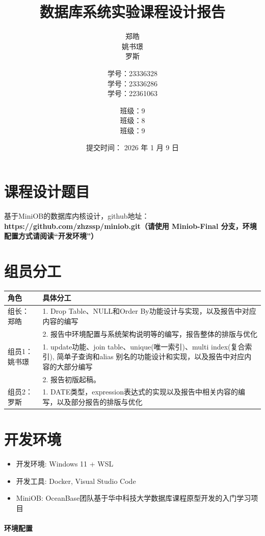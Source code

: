 \documentclass[a4paper, 12pt]{article}
\title{\heiti 数据库系统实验课程设计报告}
\author{
    郑皓 \\ 姚书璟\\ 罗斯
    \and
    学号：23336328  \\ 学号：23336286 \\ 学号：22361063
    \and
    班级：9 \\ 班级：8 \\ 班级：9
}
\date{提交时间： 2026 年 1 月 9 日}
\begin{document}
\maketitle

\section*{\heiti 课程设计题目}
基于MiniOB的数据库内核设计，github地址：\textbf{\heiti https://github.com/zhzssp/miniob.git（请使用 Miniob-Final 分支，环境配置方式请阅读“开发环境”）}

\section*{\heiti 组员分工}
\renewcommand{\arraystretch}{1.5}  %
\begin{tabular}{|p{3cm}|p{12cm}|}
    \hline  %
    \textbf{角色} & \textbf{具体分工} \\
    \hline
    \centering 组长：郑皓 & 
    1. Drop Table、NULL和Order By功能设计与实现，以及报告中对应内容的编写 \\
    & 2. 报告中环境配置与系统架构说明等的编写，报告整体的排版与优化 \\
    \hline
    \centering 组员1：姚书璟 & 
    1. update功能、join table、unique(唯一索引)、multi index(复合索引),  简单子查询和alias 别名的功能设计和实现，以及报告中对应内容的大部分编写\\
    &2. 报告初版起稿。\\
    \hline
    \centering 组员2：罗斯 & 
    1. DATE类型，expression表达式的实现以及报告中相关内容的编写，以及部分报告的排版与优化\\
    \hline
\end{tabular}

\tableofcontents

\section{\heiti 开发环境}
\begin{itemize}
    \item 开发环境: Windows 11 + WSL
    \item 开发工具: Docker, Visual Studio Code
    \item MiniOB: OceanBase团队基于华中科技大学数据库课程原型开发的入门学习项目
\end{itemize}

\paragraph{\heiti 环境配置}
\end{document}
